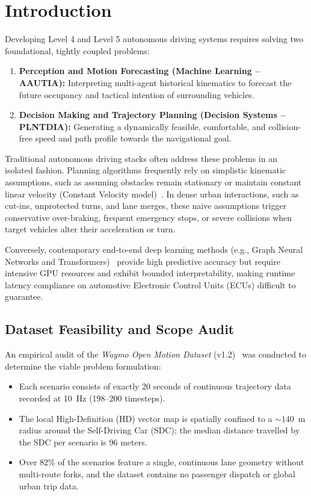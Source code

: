\documentclass[runningheads]{llncs}
\begin{document}
\section{Introduction}
Developing Level 4 and Level 5 autonomous driving systems requires solving two foundational, tightly coupled problems:
\begin{enumerate}
    \item \textbf{Perception and Motion Forecasting (Machine Learning -- AAUTIA):} Interpreting multi-agent historical kinematics to forecast the future occupancy and tactical intention of surrounding vehicles.
    \item \textbf{Decision Making and Trajectory Planning (Decision Systems -- PLNTDIA):} Generating a dynamically feasible, comfortable, and collision-free speed and path profile towards the navigational goal.
\end{enumerate}

Traditional autonomous driving stacks often address these problems in an isolated fashion. Planning algorithms frequently rely on simplistic kinematic assumptions, such as assuming obstacles remain stationary or maintain constant linear velocity (Constant Velocity model)~\cite{paden2016survey,werling2010optimal}. In dense urban interactions, such as cut-ins, unprotected turns, and lane merges, these naive assumptions trigger conservative over-braking, frequent emergency stops, or severe collisions when target vehicles alter their acceleration or turn.

Conversely, contemporary end-to-end deep learning methods (e.g., Graph Neural Networks and Transformers)~\cite{gao2020vectornet,salzmann2020trajectron++} provide high predictive accuracy but require intensive GPU resources and exhibit bounded interpretability, making runtime latency compliance on automotive Electronic Control Units (ECUs) difficult to guarantee.

\subsection{Dataset Feasibility and Scope Audit}
An empirical audit of the \textit{Waymo Open Motion Dataset} (v1.2)~\cite{ettinger2021large} was conducted to determine the viable problem formulation:
\begin{itemize}
    \item Each scenario consists of exactly 20 seconds of continuous trajectory data recorded at 10~Hz (198--200 timesteps).
    \item The local High-Definition (HD) vector map is spatially confined to a $\sim 140$~m radius around the Self-Driving Car (SDC); the median distance travelled by the SDC per scenario is 96 meters.
    \item Over 82\% of the scenarios feature a single, continuous lane geometry without multi-route forks, and the dataset contains no passenger dispatch or global urban trip data.
\end{itemize}
\end{document}
